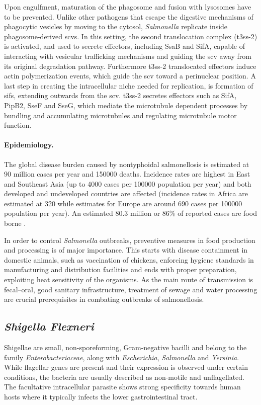 Upon engulfment, maturation of the phagosome and fusion with lysosomes have to be prevented. Unlike other pathogens that escape the digestive mechanisms of phagocytic vesicles by moving to the cytosol, \textit{Salmonella} replicate inside phagosome-derived \glspl{scv}. In this setting, the second translocation complex (\gls{t3ss}-2) is activated, and used to secrete effectors, including SsaB and SifA, capable of interacting with vesicular trafficking mechanisms and guiding the \gls{scv} away from its original degradation pathway. Furthermore \gls{t3ss}-2 translocated effectors induce actin polymerization events, which guide the \gls{scv} toward a perinuclear position. A last step in creating the intracellular niche needed for replication, is formation of \glspl{sif}, extending outwards from the \gls{scv}. \Gls{t3ss}-2 secretes effectors such as SifA, PipB2, SseF and SseG, which mediate the microtubule dependent processes by bundling and accumulating microtubules and regulating microtubule motor function.

\paragraph{Epidemiology.}
The global disease burden caused by nontyphoidal salmonellosis is estimated at 90 million cases per year and 150000 deaths. Incidence rates are highest in East and Southeast Asia (up to 4000 cases per 100000 population per year) and both developed and undeveloped countries are affected (incidence rates in Africa are estimated at 320 while estimates for Europe are around 690 cases per 100000 population per year). An estimated 80.3 million or 86\% of reported cases are food borne \citep{Majowicz2010}.

In order to control \textit{Salmonella} outbreaks, preventive measures in food production and processing is of major importance. This starts with disease containment in domestic animals, such as vaccination of chickens, enforcing  hygiene standards in manufacturing and distribution facilities and ends with proper preparation, exploiting heat sensitivity of the organisms. As the main route of transmission is fecal--oral, good sanitary infrastructure, treatment of sewage and water processing are crucial prerequisites in combating outbreaks of salmonellosis.

\subsection{\textit{Shigella Flexneri}}
Shigellae are small, non-sporeforming, Gram-negative bacilli and belong to the family \textit{Enterobacteriaceae}, along with \textit{Escherichia}, \textit{Salmonella} and \textit{Yersinia}. While flagellar genes are present and their expression is observed under certain conditions, the bacteria are usually described as non-motile and unflagellated. The facultative intracellular parasite shows strong specificity towards human hosts where it typically infects the lower gastrointestinal tract.

